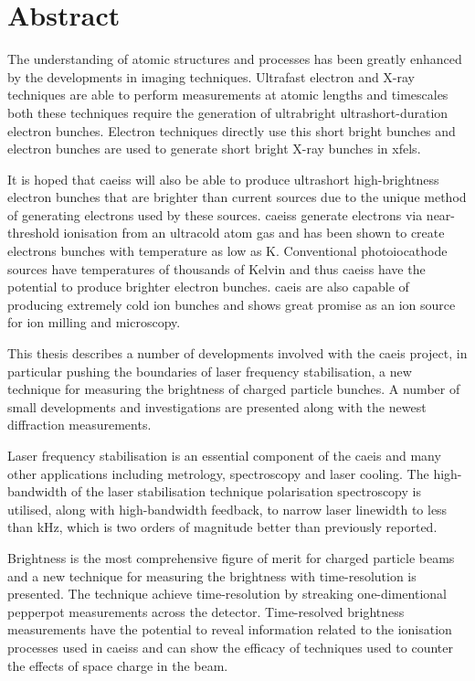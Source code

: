 \chapter*{Abstract}

The understanding of atomic structures and processes has been greatly enhanced by the developments in imaging techniques.
Ultrafast electron and X-ray techniques are able to perform measurements at atomic lengths and timescales both these techniques require the generation of ultrabright ultrashort-duration electron bunches.
Electron techniques directly use this short bright bunches and electron bunches are used to generate short bright X-ray bunches in \glspl{xfel}.

It is hoped that \glspl{caeis} will also be able to produce ultrashort high-brightness electron bunches that are brighter than current sources due to the unique method of generating electrons used by these sources.
\Glspl{caeis} generate electrons via near-threshold ionisation from an ultracold atom gas and has been shown to create electrons bunches with temperature as low as \unit[10]{K}.
Conventional photoiocathode sources have temperatures of thousands of Kelvin and thus \glspl{caeis} have the potential to produce brighter electron bunches.
\Gls{caeis} are also capable of producing extremely cold ion bunches and shows great promise as an ion source for ion milling and microscopy.

This thesis describes a number of developments involved with the \gls{caeis} project, in particular pushing the boundaries of laser frequency stabilisation, a new technique for measuring the brightness of charged particle bunches.
A number of small developments and investigations are presented along with the newest diffraction measurements.

Laser frequency stabilisation is an essential component of the \gls{caeis} and many other applications including metrology, spectroscopy and laser cooling.
The high-bandwidth of the laser stabilisation technique polarisation spectroscopy is utilised, along with high-bandwidth feedback, to narrow laser linewidth to less than \unit[1]{kHz}, which is two orders of magnitude better than previously reported.

Brightness is the most comprehensive figure of merit for charged particle beams and a new technique for measuring the brightness with time-resolution is presented.
The technique achieve time-resolution by streaking one-dimentional pepperpot measurements across the detector.
Time-resolved brightness measurements have the potential to reveal information related to the ionisation processes used in \glspl{caeis} and can show the efficacy of techniques used to counter the effects of space charge in the beam.

